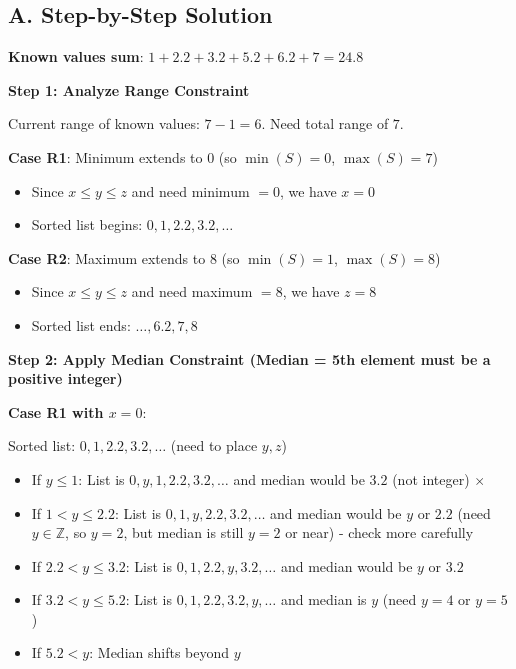 \documentclass[11pt]{article}
\begin{document}
\begin{solutionbox}
\subsection*{A. Step-by-Step Solution}

\textbf{Known values sum}: $1 + 2.2 + 3.2 + 5.2 + 6.2 + 7 = 24.8$

\textbf{Step 1: Analyze Range Constraint}

Current range of known values: $7 - 1 = 6$. Need total range of $7$.

\textbf{Case R1}: Minimum extends to $0$ (so $\min(S) = 0$, $\max(S) = 7$)
\begin{itemize}
    \item Since $x \leq y \leq z$ and need minimum $= 0$, we have $x = 0$
    \item Sorted list begins: $0, 1, 2.2, 3.2, \ldots$
\end{itemize}

\textbf{Case R2}: Maximum extends to $8$ (so $\min(S) = 1$, $\max(S) = 8$)
\begin{itemize}
    \item Since $x \leq y \leq z$ and need maximum $= 8$, we have $z = 8$  
    \item Sorted list ends: $\ldots, 6.2, 7, 8$
\end{itemize}

\textbf{Step 2: Apply Median Constraint (Median = 5th element must be a positive integer)}

\textbf{Case R1 with $x = 0$}:

Sorted list: $0, 1, 2.2, 3.2, \ldots$ (need to place $y, z$)

\begin{itemize}
    \item If $y \leq 1$: List is $0, y, 1, 2.2, 3.2, \ldots$ and median would be $3.2$ (not integer) $\times$
    \item If $1 < y \leq 2.2$: List is $0, 1, y, 2.2, 3.2, \ldots$ and median would be $y$ or $2.2$ (need $y \in \mathbb{Z}$, so $y = 2$, but median is still $y = 2$ or near) - check more carefully
    \item If $2.2 < y \leq 3.2$: List is $0, 1, 2.2, y, 3.2, \ldots$ and median would be $y$ or $3.2$
    \item If $3.2 < y \leq 5.2$: List is $0, 1, 2.2, 3.2, y, \ldots$ and median is $y$ (need $y = 4$ or $y = 5$)
    \item If $5.2 < y$: Median shifts beyond $y$
\end{itemize}


\end{solutionbox}
\end{document}
